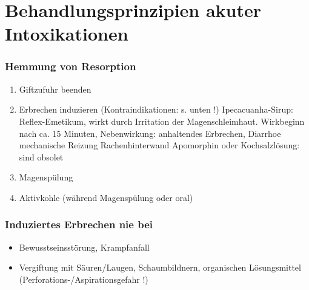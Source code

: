 \documentclass[10pt,a4paper]{report}
\begin{document}
\section{Behandlungsprinzipien akuter Intoxikationen} %
\label{sec:behandlungsprinzipien_akuter_intoxikationen}
\subsubsection{Hemmung von Resorption} %
\label{ssub:hemmung_von_resorption}
\begin{enumerate}
	\item Giftzufuhr beenden
	\item Erbrechen induzieren (Kontraindikationen: s. unten !) Ipecacuanha-Sirup: Reflex-Emetikum, wirkt durch Irritation der Magenschleimhaut. Wirkbeginn nach ca. 15 Minuten, Nebenwirkung: anhaltendes Erbrechen, Diarrhoe mechanische Reizung Rachenhinterwand Apomorphin oder Kochsalzlösung: sind obsolet
 	\item Magenspülung
	\item Aktivkohle (während Magenspülung oder oral)
\end{enumerate}
\subsubsection{Induziertes Erbrechen nie bei} %
\label{ssub:induziertes_erbrechen_nie_bei}
\begin{itemize}
	\item Bewusstseinsstörung, Krampfanfall
	\item Vergiftung mit Säuren/Laugen, Schaumbildnern, organischen Lösungsmittel (Perforations-/Aspirationsgefahr !)
\end{itemize}
\end{document}
